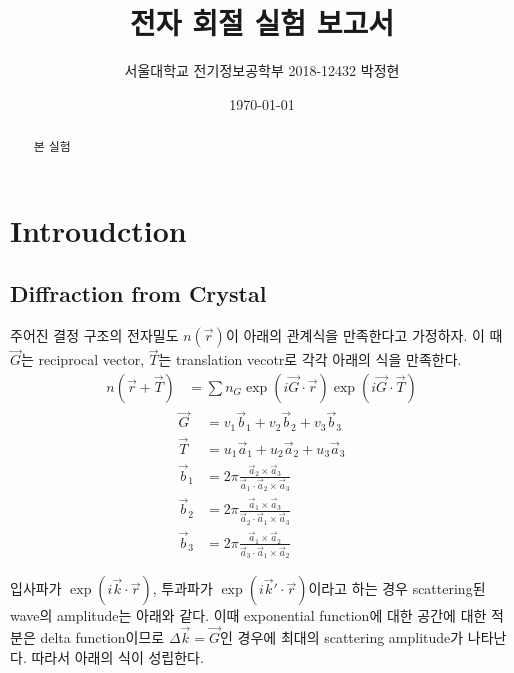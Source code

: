 \documentclass[%
 reprint,
 amsmath,amssymb,
 aps,
]{revtex4-2}
\begin{document}
\title{전자 회절 실험 보고서}

\author{서울대학교 전기정보공학부 2018-12432 박정현}
\date{\today}%

\begin{abstract}
본 실험
\end{abstract}

\maketitle


\section{\label{sec:level1}Introudction}
\subsection{\label{sec:level2}Diffraction from Crystal}
주어진 결정 구조의 전자밀도 $n(\vec{r})$이 아래의 관계식을 만족한다고 가정하자. 이 때 $\vec{G}$는 reciprocal vector, $\vec{T}$는 translation vecotr로 각각 아래의 식을 만족한다.
\begin{align}
	n(\vec{r}+\vec{T}) &= \sum n_{G}\exp(i\vec{G}\cdot \vec{r})\exp(i\vec{G}\cdot\vec{T})
\end{align}
\begin{align}
	\vec{G} &= v_{1}\vec{b}_{1} + v_{2}\vec{b}_{2} + v_{3}\vec{b}_{3}\\
	\vec{T} &=  u_{1}\vec{a}_{1} + u_{2}\vec{a}_{2} + u_{3}\vec{a}_{3}\\
	\vec{b}_{1} &= 2\pi\frac{\vec{a}_{2}\times\vec{a}_{3}}{\vec{a}_{1}\cdot\vec{a}_{2}\times\vec{a}_{3}}\\
	\vec{b}_{2} &= 2\pi\frac{\vec{a}_{1}\times\vec{a}_{3}}{\vec{a}_{2}\cdot\vec{a}_{1}\times\vec{a}_{3}}\\
	\vec{b}_{3} &= 2\pi\frac{\vec{a}_{1}\times\vec{a}_{2}}{\vec{a}_{3}\cdot\vec{a}_{1}\times\vec{a}_{2}}
\end{align}

입사파가 $\exp(i\vec{k}\cdot\vec{r})$, 투과파가 $\exp(i\vec{k}'\cdot\vec{r})$이라고 하는 경우 scattering된 wave의 amplitude는 아래와 같다. 이때 exponential function에 대한 공간에 대한 적분은 delta function이므로 $\Delta\vec{k} = \vec{G}$인 경우에 최대의 scattering amplitude가 나타난다. 따라서 아래의 식이 성립한다.
\end{document}
